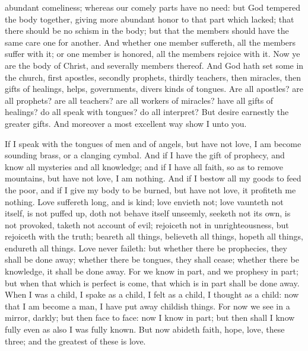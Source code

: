 abundant comeliness; whereas our comely parts have no need: but God tempered the body together, giving more abundant honor to that part which lacked; that there should be no schism in the body; but that the members should have the same care one for another. And whether one member suffereth, all the members suffer with it; or one member is honored, all the members rejoice with it. Now ye are the body of Christ, and severally members thereof. And God hath set some in the church, first apostles, secondly prophets, thirdly teachers, then miracles, then gifts of healings, helps, governments, divers kinds of tongues. Are all apostles? are all prophets? are all teachers? are all workers of miracles? have all gifts of healings? do all speak with tongues? do all interpret? But desire earnestly the greater gifts. And moreover a most excellent way show I unto you. 

If I speak with the tongues of men and of angels, but have not love, I am become sounding brass, or a clanging cymbal. And if I have the gift of prophecy, and know all mysteries and all knowledge; and if I have all faith, so as to remove mountains, but have not love, I am nothing. And if I bestow all my goods to feed the poor, and if I give my body to be burned, but have not love, it profiteth me nothing. Love suffereth long, and is kind; love envieth not; love vaunteth not itself, is not puffed up, doth not behave itself unseemly, seeketh not its own, is not provoked, taketh not account of evil; rejoiceth not in unrighteousness, but rejoiceth with the truth; beareth all things, believeth all things, hopeth all things, endureth all things. Love never faileth: but whether there be prophecies, they shall be done away; whether there be tongues, they shall cease; whether there be knowledge, it shall be done away. For we know in part, and we prophesy in part; but when that which is perfect is come, that which is in part shall be done away. When I was a child, I spake as a child, I felt as a child, I thought as a child: now that I am become a man, I have put away childish things. For now we see in a mirror, darkly; but then face to face: now I know in part; but then shall I know fully even as also I was fully known. But now abideth faith, hope, love, these three; and the greatest of these is love. 

